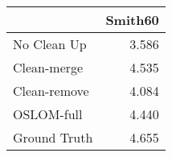 \begin{tabular}{lr}
\toprule
{} & Smith60 \\
\midrule
No Clean Up  &   3.586 \\
Clean-merge  &   4.535 \\
Clean-remove &   4.084 \\
OSLOM-full   &   4.440 \\
Ground Truth &   4.655 \\
\bottomrule
\end{tabular}
